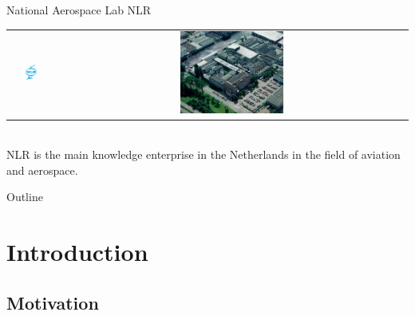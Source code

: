 \documentclass{beamer}
\begin{document}
\begin{frame}{National Aerospace Lab NLR}
\begin{center}
\begin{tabular}{ c c }
\includegraphics[width = 0.3\textwidth]{images/nlr_logo.jpg} & \includegraphics[width = 0.3\textwidth]{images/nlr_lucht.jpg}
\end{tabular}\\
NLR is the main knowledge enterprise in the Netherlands in the field of aviation and aerospace.
\end{center}
\end{frame}

\begin{frame}{Outline}
  \setcounter{tocdepth}{1}
  \tableofcontents
\end{frame}

\section{Introduction}
\subsection{Motivation}
\end{document}
